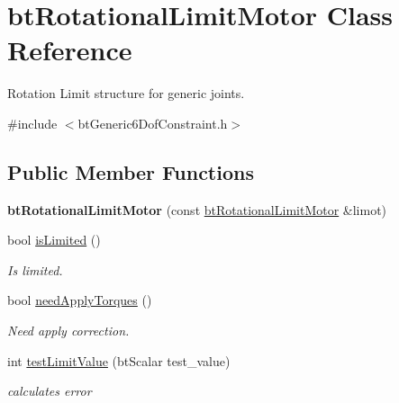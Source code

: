 \hypertarget{classbtRotationalLimitMotor}{}\section{bt\+Rotational\+Limit\+Motor Class Reference}
\label{classbtRotationalLimitMotor}


Rotation Limit structure for generic joints.  




{\ttfamily \#include $<$bt\+Generic6\+Dof\+Constraint.\+h$>$}

\subsection*{Public Member Functions}
\begin{DoxyCompactItemize}
\item 
\mbox{\label{classbtRotationalLimitMotor_a2e7652de69dacf8f37eaef5fd460f4a3}} 
{\bfseries bt\+Rotational\+Limit\+Motor} (const \hyperlink{classbtRotationalLimitMotor}{bt\+Rotational\+Limit\+Motor} \&limot)
\item 
\mbox{\label{classbtRotationalLimitMotor_ac47bf3f6fe0afc82d123407221d4cb10}} 
bool \hyperlink{classbtRotationalLimitMotor_ac47bf3f6fe0afc82d123407221d4cb10}{is\+Limited} ()
\begin{DoxyCompactList}\small\item\em Is limited. \end{DoxyCompactList}\item 
\mbox{\label{classbtRotationalLimitMotor_af8f10179d361ad46f5a4636822af6d7d}} 
bool \hyperlink{classbtRotationalLimitMotor_af8f10179d361ad46f5a4636822af6d7d}{need\+Apply\+Torques} ()
\begin{DoxyCompactList}\small\item\em Need apply correction. \end{DoxyCompactList}\item 
int \hyperlink{classbtRotationalLimitMotor_ac0651bd36beda2dbb23c45a90dc1cccd}{test\+Limit\+Value} (bt\+Scalar test\+\_\+value)
\begin{DoxyCompactList}\small\item\em calculates error \end{DoxyCompactList}\item 

\end{DoxyCompactItemize}
